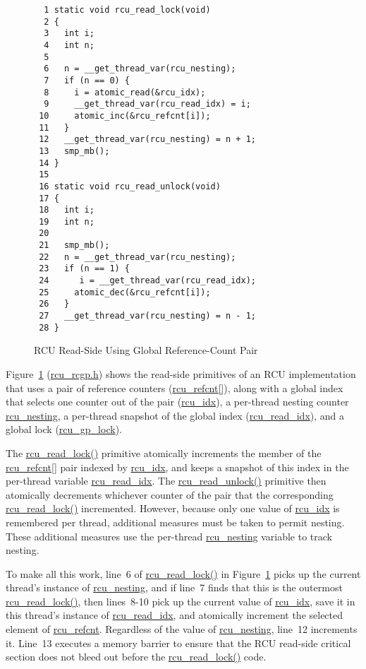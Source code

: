 \begin{figure}[tbp]
{ \scriptsize
\begin{verbatim}
  1 static void rcu_read_lock(void)
  2 {
  3   int i;
  4   int n;
  5 
  6   n = __get_thread_var(rcu_nesting);
  7   if (n == 0) {
  8     i = atomic_read(&rcu_idx);
  9     __get_thread_var(rcu_read_idx) = i;
 10     atomic_inc(&rcu_refcnt[i]);
 11   }
 12   __get_thread_var(rcu_nesting) = n + 1;
 13   smp_mb();
 14 }
 15 
 16 static void rcu_read_unlock(void)
 17 {
 18   int i;
 19   int n;
 20 
 21   smp_mb();
 22   n = __get_thread_var(rcu_nesting);
 23   if (n == 1) {
 24      i = __get_thread_var(rcu_read_idx);
 25     atomic_dec(&rcu_refcnt[i]);
 26   }
 27   __get_thread_var(rcu_nesting) = n - 1;
 28 }
\end{verbatim}
}
\caption{RCU Read-Side Using Global Reference-Count Pair}
\label{fig:defer:RCU Read-Side Using Global Reference-Count Pair}
\end{figure}

Figure~\ref{fig:defer:RCU Read-Side Using Global Reference-Count Pair}
(\url{rcu_rcgp.h})
shows the read-side primitives of an RCU implementation that uses a pair
of reference counters (\url{rcu_refcnt[]}),
along with a global index that
selects one counter out of the pair (\url{rcu_idx}),
a per-thread nesting counter \url{rcu_nesting},
a per-thread snapshot of the global index (\url{rcu_read_idx}),
and a global lock (\url{rcu_gp_lock}).

The \url{rcu_read_lock()} primitive atomically increments the member of the
\url{rcu_refcnt[]} pair indexed by \url{rcu_idx}, and keeps a
snapshot of this index in the per-thread variable \url{rcu_read_idx}.
The \url{rcu_read_unlock()} primitive then atomically decrements
whichever counter of the pair that the corresponding \url{rcu_read_lock()}
incremented.
However, because only one value of \url{rcu_idx} is remembered per thread,
additional measures must be taken to permit nesting.
These additional measures use the per-thread \url{rcu_nesting} variable
to track nesting.

To make all this work, line~6 of \url{rcu_read_lock()} in
Figure~\ref{fig:defer:RCU Read-Side Using Global Reference-Count Pair}
picks up the
current thread's instance of \url{rcu_nesting}, and if line~7 finds
that this is the outermost \url{rcu_read_lock()},
then lines~8-10 pick up the current value of
\url{rcu_idx}, save it in this thread's instance of \url{rcu_read_idx},
and atomically increment the selected element of \url{rcu_refcnt}.
Regardless of the value of \url{rcu_nesting}, line~12 increments it.
Line~13 executes a memory barrier to ensure that the RCU read-side
critical section does not bleed out before the \url{rcu_read_lock()} code.


